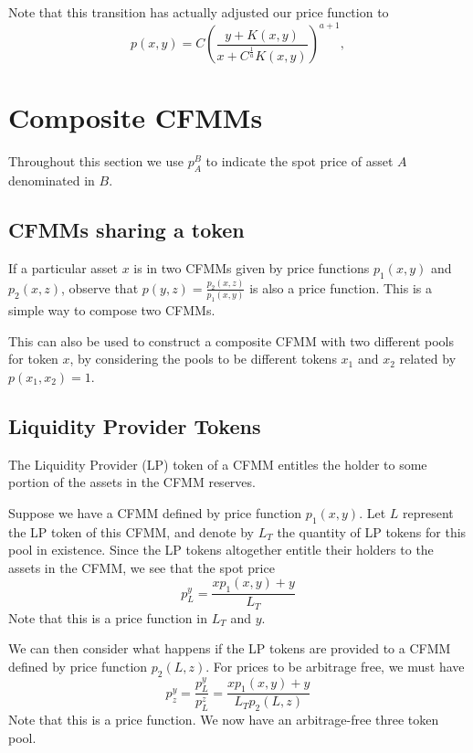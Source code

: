 \documentclass[11pt]{article} %
\begin{document}
Note that this transition has actually adjusted our price function to
$$
p(x,y) = C\left(\frac{y + K(x,y)}{x + C^\frac{1}{a} K(x,y)}\right)^{a+1},
$$

\section{Composite CFMMs}

Throughout this section we use $p_A^B$ to indicate the spot price of asset $A$ denominated in $B$.

\subsection{CFMMs sharing a token}

If a particular asset $x$ is in two CFMMs given by price functions $p_1(x,y)$ and $p_2(x,z)$, observe that $p(y,z) = \frac{p_2(x,z)}{p_1(x,y)}$ is also a price function. This is a simple way to compose two CFMMs.

This can also be used to construct a composite CFMM with two different pools for token $x$, by considering the pools to be different tokens $x_1$ and $x_2$ related by $p(x_1,x_2) = 1$.

\subsection{Liquidity Provider Tokens}

The Liquidity Provider (LP) token of a CFMM entitles the holder to some portion of the assets in the CFMM reserves.

Suppose we have a CFMM defined by price function $p_1(x,y)$. Let $L$ represent the LP token of this CFMM, and denote by $L_T$ the quantity of LP tokens for this pool in existence.
Since the LP tokens altogether entitle their holders to the assets in the CFMM, we see that the spot price
$$
p_L^y = \frac{xp_1(x,y) + y}{L_T}
$$
Note that this is a price function in $L_T$ and $y$.

We can then consider what happens if the LP tokens are provided to a CFMM defined by price function $p_2(L, z)$.
For prices to be arbitrage free, we must have
$$
p_z^y = \frac{p_L^y}{p_L^z} = \frac{xp_1(x,y) + y}{L_Tp_2(L, z)}
$$
Note that this is a price function. We now have an arbitrage-free three token pool.

{}

\end{document}
